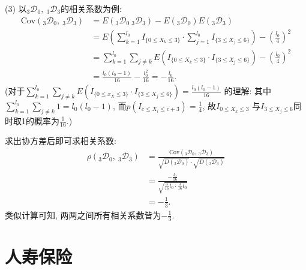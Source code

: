 \documentclass[lang=cn,10pt]{elegantbook}
\begin{document}
\begin{solution}
    (3) 以$_{3}\mathscr D _{0},\ _{3}\mathscr D _{3}$的相关系数为例:
    \begin{equation*}
        \begin{aligned}
            \text{Cov}(_{3}\mathscr D _{0},\ _{3}\mathscr D _{3}) & =E({}_{3}\mathscr D _{0}\ _{3}\mathscr D _{3})-E(_{3}\mathscr D _{0})E(_{3}\mathscr D _{3})                              \\
                                                                  & =E(\sum ^{l_{0}}_{k=1}I_{\{0\leq X_{k}\leq 3\}}\cdot \sum ^{l_{0}}_{j=1}I_{\{3\leq X_{j}\leq 6\}})-(\frac{l_{0}}{4})^{2} \\
                                                                  & =\sum^{l_{0}}_{k=1}\sum_{j\neq k}E(I_{\{0\leq X_{k}\leq 3\}}\cdot I_{\{3\leq X_{j}\leq 6\}})-(\frac{ l_{0}}{4})^{2}      \\
                                                                  & =\frac{l_{0}(l_{0}-1)}{16}-\frac{l_{0}^{2}}{16}  =-\frac{l_{0}}{16}.
        \end{aligned}
    \end{equation*}
    (对于$\sum^{l_{0}}_{k=1}\sum_{j\neq k}E(I_{\{0\leq x_{X}\leq 3\}}\cdot I_{\{3\leq X_{j}\leq 6\}}) = \frac{l_{0}(l_{0}-1)}{16}$ 的理解: 其中$\sum^{l_{0}}_{k=1}\sum_{j\neq k}1 = l_0(l_0-1)$, 而$p(I_{c\leq X_{i}\leq c+3}) = \frac14$, 故$I_{0\leq X_{k}\leq 3}$ 与$I_{3\leq X_{j}\leq 6}$同时取1的概率为$\frac{1}{16}$.)

    求出协方差后即可求相关系数:
    \begin{align*}
        \rho(_{3}\mathscr D _{0},\ _{3}\mathscr D _{3}) & =\frac{\text{Cov}(_{3}\mathscr D_{0},\ _{3}\mathscr D _{3})}{\sqrt{D(_{3}\mathscr D _{0})}\cdot \sqrt{D(_{3}\mathscr D _{3})}} \\
                                                        & =\frac{-\frac{l_{0}}{16}}{\sqrt{\frac{3}{16}l_{0}\cdot \frac{3}{16}l_{0}}}                                                     \\
                                                        & =-\frac{1}{3}.
    \end{align*}
    类似计算可知, 两两之间所有相关系数皆为$-\frac{1}{3}$.
\end{solution}

\chapter{人寿保险}
\end{document}
